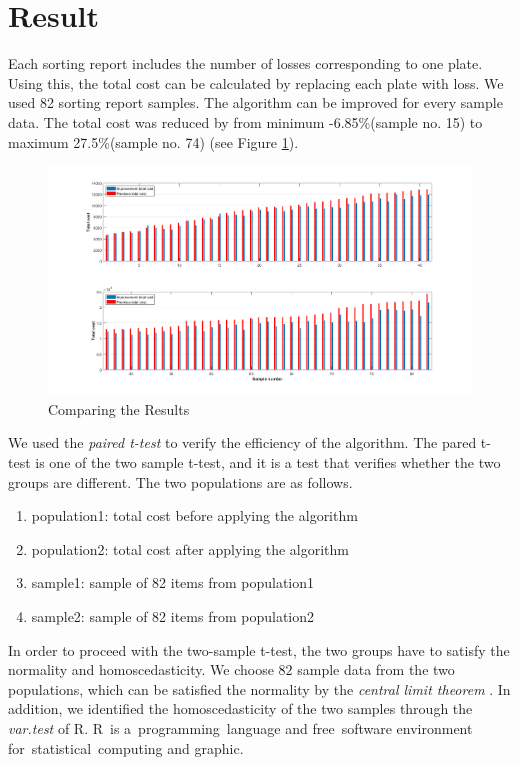 \section{Result}\label{sec:Result}

Each sorting report includes the number of losses corresponding to one plate. 
Using this, the total cost can be calculated by replacing each plate with loss. 
We used 82 sorting report samples. The algorithm can be improved for every sample data.
The total cost was reduced by from minimum -6.85\%(sample no. 15) to maximum 27.5\%(sample no. 74) (see Figure \ref{fig:Comparing}).

\begin{figure}[h!]
	\centering
	\includegraphics[width=\linewidth]{Graph_2.png}
	\caption{Comparing the Results}
	\label{fig:Comparing}       %
\end{figure}

We used the {\it paired t-test}\cite{Rice} to verify the efficiency of the algorithm. The pared t-test is one of the two sample t-test, and it is a test that verifies whether the two groups are different. The two populations are as follows.

\begin{enumerate}[$\bullet$]
	\item population1: total cost before applying the algorithm
	\item population2: total cost after applying the algorithm
	\item sample1: sample of 82 items from population1
	\item sample2: sample of 82 items from population2
\end{enumerate}

In order to proceed with the two-sample t-test, the two groups have to satisfy the normality and homoscedasticity. We choose $82$ sample data from the two populations, which can be satisfied the normality by the {\it central limit theorem} \cite{Durrett}.
In addition, we identified the homoscedasticity of the two samples through the {\it var.test} of R. 
R is a programming language and free software environment for statistical computing and graphic. %



